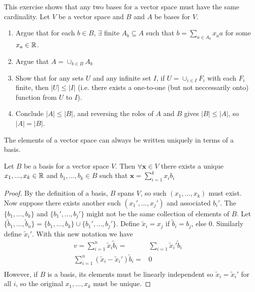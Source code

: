 \begin{exercise}\label{ex:basis2}
  This exercise shows that any two bases for a vector space must have
  the same cardinality. Let $V$ be a vector space and $B$ and $A$ be
  bases for $V$. 
  \begin{enumerate}
  \item Argue that for each $b \in B$, $\exists$ finite $A_b \subseteq
    A$ such that $b = \sum_{a \in A_b} x_a a$ for some $x_a \in \mathbb{R}$.
  \item Argue that $A = \cup_{b \in B} A_b$
  \item Show that for any sets $U$ and any infinite set $I$, if $U = \cup_{i \in I}
    F_i$ with each $F_i$ finite, then $|U| \leq |I|$ (i.e. there
    exists a one-to-one (but not neccessarily onto) function from $U$
    to $I$). 
  \item Conclude $|A| \leq |B|$, and reversing the roles of $A$ and
    $B$ gives $|B| \leq |A|$, so $|A| = |B|$.
  \end{enumerate}
\end{exercise}

The elements of a vector space can always be written uniquely in terms
of a basis.
\begin{lemma} \label{lem:uniqueRep}
  Let $B$ be a basis for a vector space $V$. Then
  $\forall \mathbf{x} \in V$ there exists a unique $x_1, ..., x_k \in \mathbb{R}$ and
  $b_1, ..., b_k \in B$
  such that $\mathbf{x} = \sum_{i=1}^k x_i b_i$  
\end{lemma}
\begin{proof}
  By the definition of a basis, $B$ spans $V$, so such
  $(x_1, ..., x_k)$ must exist. Now suppose there exists another such
  $(x_1', ..., x_j')$ and associated $b_i'$. The $\{b_1, ..., b_k\}$ and
  $\{b_1', ..., b_j'\}$ might not be the same collection of elements
  of $B$. Let $\{\tilde{b}_1, ..., \tilde{b}_n \} =  \{b_1, ...,
  b_k\} \cup \{b_1', ..., b_j'\}$. Define $\tilde{x}_i = x_j$ if
  $\tilde{b}_i = b_j$, else $0$. Similarly define $\tilde{x}_i'$. With
  this new notation we have
  \begin{align*}
    v = \sum_{i=1}^n \tilde{x}_i \tilde{b}_i = & \sum_{i=1} \tilde{x}_i' \tilde{b}_i \\
    \sum_{i=1}^n (\tilde{x}_i - \tilde{x}_i')\tilde{b}_i = & 0 \\
  \end{align*}
  However, if $B$ is a basis, its elements must be linearly
  independent so $\tilde{x}_i = \tilde{x}_i'$ for all $i$, so the
  original $x_1, ..., x_k$ must be unique.
\end{proof}

